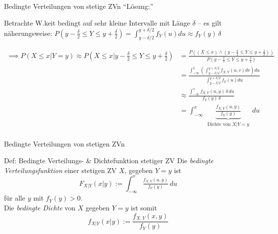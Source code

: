 \documentclass[
  10pt,
  ignorenonframetext,
]{beamer}
\begin{document}
\begin{frame}{Bedingte Verteilungen von stetige ZVn}
\label{bedingte-verteilungen-von-stetige-zvn}
``Lösung:''

Betrachte W.keit bedingt auf sehr kleine Intervalle mit Länge \(\delta\)
-- es gilt näherungsweise:
\(P(y-\tfrac{\delta}{2} \leq Y \leq y + \tfrac{\delta}{2}) = \int^{y + \delta/2}_{y-\delta/2} f_Y(u)du \approx f_Y(y) \, \delta\)

\begin{small}
\begin{align*}
\implies P(X \leq x| Y = y) \approx P(X \leq x| y-\tfrac{\delta}{2} \leq Y \leq y + \tfrac{\delta}{2}) &=  \frac{P\left((X \leq x) \land (y-\tfrac{\delta}{2} \leq Y \leq y + \tfrac{\delta}{2})\right)}
{P(y-\tfrac{\delta}{2} \leq Y \leq y + \tfrac{\delta}{2})} \\
  &=  \frac{\int_{-\infty}^x \left(\int^{y + \delta/2}_{y-\delta/2} f_{X,Y}(u, v) dv\right) du}{\int^{y + \delta/2}_{y-\delta/2} f_Y(u)du}\\
& \approx  \frac{\int_{-\infty}^x f_{X,Y}(u,y) \, \delta \, du} {f_Y(y) \, \delta} \\
& =  \int_{-\infty}^x \,\underbrace{\frac{f_{X,Y}(u,y)}{f_Y(y)}}_{\substack{\text{Dichte von $X | Y = y$}\\}} \,du
\end{align*}
\end{small}
\end{frame}

\begin{frame}{Bedingte Verteilungen von stetigen ZVn}
\label{bedingte-verteilungen-von-stetigen-zvn-1}
\begin{block}{Def: Bedingte Verteilungs- \& Dichtefunktion stetiger ZV}
\label{def-bedingte-verteilungs--dichtefunktion-stetiger-zv}
Die \emph{bedingte Verteilungsfunktion} einer stetigen ZV \(X\), gegeben
\(Y = y\) ist \[
F_{X|Y}(x|y) := \int_{-\infty}^x \tfrac{f_{X,Y}(u,y)}{f_Y(y)} \, du
\] für alle \(y\) mit \(f_Y(y) > 0\).\\
Die \emph{bedingte Dichte} von \(X\) gegeben \(Y = y\) ist somit \[
f_{X|Y}(x|y) := \frac{f_{X,Y}(x,y)}{f_Y(y)}
\]
\end{block}
\end{frame}
\end{document}
